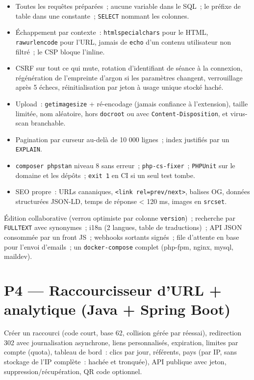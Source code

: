 \begin{itemize}
  \item Toutes les requ\^etes pr\'epar\'ees~; aucune variable dans le SQL~; le pr\'efixe de table dans une
        constante~; \verb|SELECT| nommant les colonnes.
  \item \'Echappement par contexte~: \verb|htmlspecialchars| pour le HTML, \verb|rawurlencode| pour
        l'URL, jamais de \verb|echo| d'un contenu utilisateur non filtr\'e~; le CSP bloque l'inline.
  \item CSRF sur tout ce qui mute, rotation d'identifiant de s\'eance \`a la connexion, r\'eg\'en\'eration
        de l'empreinte d'argon si les param\`etres changent, verrouillage apr\`es 5 \'echecs,
        r\'einitialisation par jeton \`a usage unique stock\'e hach\'e.
  \item Upload~: \verb|getimagesize| + r\'e-encodage (jamais confiance \`a l'extension), taille limit\'ee,
        nom al\'eatoire, hors \verb|docroot| ou avec \verb|Content-Disposition|, et virus-scan branchable.
  \item Pagination par curseur au-del\`a de 10 000 lignes~; index justifi\'es par un \verb|EXPLAIN|.
  \item \verb|composer phpstan| niveau 8 sans erreur~; \verb|php-cs-fixer|~; \verb|PHPUnit| sur le
        domaine et les d\'ep\^ots~; \verb|exit 1| en CI si un seul test tombe.
  \item SEO propre~: URLs cananiques, \verb|<link rel=prev/next>|, balises OG, donn\'ees structur\'ees
        JSON-LD, temps de r\'eponse < 120 ms, images en \verb|srcset|.
\end{itemize}

\'Edition collaborative (verrou optimiste par colonne \verb|version|)~; recherche par \verb|FULLTEXT|
avec synonymes~; i18n (2 langues, table de traductions)~; API JSON consomm\'ee par un front JS~;
webhooks sortants sign\'es~; file d'attente en base pour l'envoi d'emails~; un
\verb|docker-compose| complet (php-fpm, nginx, mysql, maildev).

\section{P4 --- Raccourcisseur d'URL + analytique (Java + Spring Boot)}

Cr\'eer un raccourci (code court, base 62, collision g\'er\'ee par r\'eessai), redirection 302 avec
journalisation asynchrone, liens personnalis\'es, expiration, limites par compte (quota),
tableau de bord~: clics par jour, r\'ef\'erents, pays (par IP, sans stockage de l'IP compl\`ete~: hach\'ee
et tronqu\'ee), API publique avec jeton, suppression/r\'ecup\'eration, QR code optionnel.

